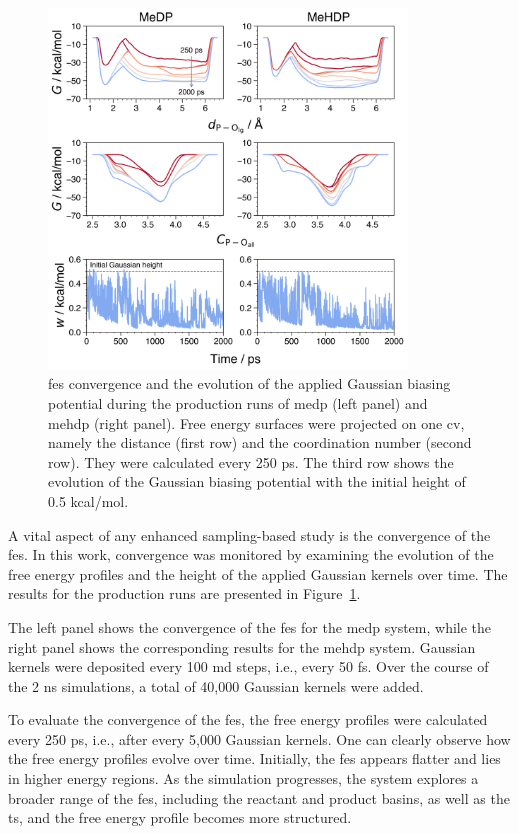 \begin{figure}[t!]
    \centering
    \includegraphics[width=0.85\textwidth]{Figures/4_Results/results_300K_fes_convergence.png}
    \caption{\ac{fes} convergence and the evolution of the applied Gaussian biasing potential during the production runs of \ac{medp} (left panel) and \ac{mehdp} (right panel). Free energy surfaces were projected on one \ac{cv}, namely the distance (first row) and the coordination number (second row). They were calculated every 250 ps. The third row shows the evolution of the Gaussian biasing potential with the initial height of 0.5 kcal/mol.}
    \label{fig:300k_fes_convergence}
\end{figure}

A vital aspect of any enhanced sampling-based study is the convergence of the \ac{fes}. In this work, convergence was monitored by examining the evolution of the free energy profiles and the height of the applied Gaussian kernels over time. The results for the production runs are presented in Figure~\ref{fig:300k_fes_convergence}.

The left panel shows the convergence of the \ac{fes} for the \ac{medp} system, while the right panel shows the corresponding results for the \ac{mehdp} system. Gaussian kernels were deposited every 100 \ac{md} steps, i.e., every 50 fs. Over the course of the 2 ns simulations, a total of 40,000 Gaussian kernels were added.

To evaluate the convergence of the \ac{fes}, the free energy profiles were calculated every 250 ps, i.e., after every 5,000 Gaussian kernels. One can clearly observe how the free energy profiles evolve over time. Initially, the \ac{fes} appears flatter and lies in higher energy regions. As the simulation progresses, the system explores a broader range of the \ac{fes}, including the reactant and product basins, as well as the \ac{ts}, and the free energy profile becomes more structured.

